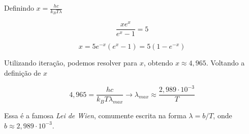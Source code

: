 \documentclass[11pt]{article}
\begin{document}
\begin{pproblem}
\begin{pssolution*}{}{}
\begin{alternativas}
        Definindo \(x = \frac{hc}{k_BT\lambda}\) 

        \[\frac{xe^x}{e^x-1}=5\]

        \[x=5e^{-x}(e^x-1) = 5(1-e^{-x})\]

        Utilizando iteração, podemos resolver para \(x\), obtendo \(x\approx 4,965\). Voltando a definição de \(x\)

        \[4,965 = \frac{hc}{k_B T\lambda_{max}}\rightarrow \boxed{\lambda_{max} \approx \frac{2,989 \cdot 10^{-3}}{T}}\]

        Essa é a famosa \textit{Lei de Wien}, comumente escrita na forma \(\lambda = b/T\), onde \(b\approx 2,989 \cdot 10^{-3}\).

    \end{alternativas}
\end{pssolution*}
\end{pproblem}
\end{document}
